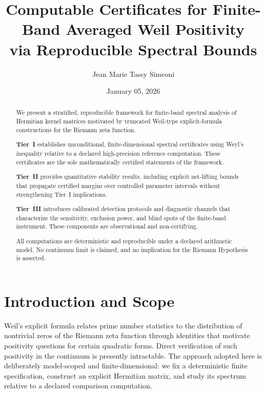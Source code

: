 \documentclass[12pt,reqno]{amsart}
\title[Computable Certificates for Finite-Band Weil Positivity]{%
Computable Certificates for Finite-Band Averaged Weil Positivity\\
via Reproducible Spectral Bounds}
\author{Jean Marie Tassy Simeoni}
\date{January 05, 2026}
\numberwithin{equation}{section}
\theoremstyle{definition}
\theoremstyle{remark}
\begin{document}
\begin{abstract}
We present a stratified, reproducible framework for finite-band spectral analysis
of Hermitian kernel matrices motivated by truncated Weil-type explicit-formula
constructions for the Riemann zeta function.

\textbf{Tier~I} establishes unconditional, finite-dimensional spectral certificates
using Weyl's inequality relative to a declared high-precision reference computation.
These certificates are the sole mathematically certified statements of the framework.

\textbf{Tier~II} provides quantitative stability results, including explicit
net-lifting bounds that propagate certified margins over controlled parameter
intervals without strengthening Tier~I implications.

\textbf{Tier~III} introduces calibrated detection protocols and diagnostic channels
that characterize the sensitivity, exclusion power, and blind spots of the
finite-band instrument. These components are observational and non-certifying.

All computations are deterministic and reproducible under a declared arithmetic
model. No continuum limit is claimed, and no implication for the Riemann Hypothesis
is asserted.
\end{abstract}

\maketitle
\tableofcontents

\section{Introduction and Scope}
\label{sec:intro}

Weil's explicit formula \cite{Weil} relates prime number statistics to the
distribution of nontrivial zeros of the Riemann zeta function through identities
that motivate positivity questions for certain quadratic forms. Direct verification
of such positivity in the continuum is presently intractable. The approach adopted
here is deliberately model-scoped and finite-dimensional: we fix a deterministic
finite specification, construct an explicit Hermitian matrix, and study its spectrum
relative to a declared comparison computation.
\end{document}

